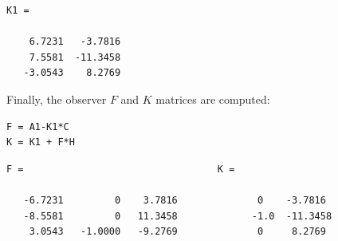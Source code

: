 \documentclass{amsart}
\theoremstyle{definition}
\theoremstyle{remark}
\numberwithin{equation}{section}
\begin{document}
        \color{lightgray} \begin{verbatim}
K1 =

    6.7231   -3.7816
    7.5581  -11.3458
   -3.0543    8.2769

\end{verbatim} \color{black}

\begin{par}
Finally, the observer $F$ and $K$ matrices are computed:
\end{par}
\begin{verbatim}
F = A1-K1*C
K = K1 + F*H
\end{verbatim}
    \color{lightgray} \begin{verbatim}
F =                                  K =

   -6.7231         0    3.7816              0    -3.7816
   -8.5581         0   11.3458             -1.0  -11.3458
    3.0543   -1.0000   -9.2769              0     8.2769

\end{verbatim} \color{black}
\end{document}
